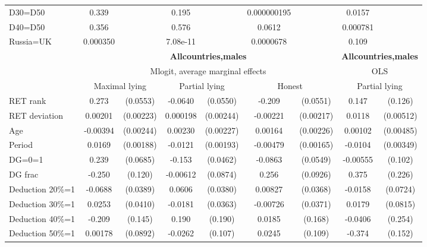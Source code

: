 \begin{tabular}{l|cccccc|cc}
D30=D50         &    0.339         &         &    0.195         &         &0.000000195         &         &   0.0157         &         \\
D40=D50         &    0.356         &         &    0.576         &         &   0.0612         &         & 0.000781         &         \\
Russia=UK       & 0.000350         &         & 7.08e-11         &         &0.0000678         &         &    0.109         &         \\
\hline\hline
&\multicolumn{6}{c|}{\bf All\space{}countries,\space{}males}&\multicolumn{2}{c}{\bf All\space{}countries,\space{}males}\\ &\multicolumn{6}{c|}{Mlogit, average marginal effects }&\multicolumn{2}{c}{OLS}\\
                &\multicolumn{2}{c}{Maximal lying}&\multicolumn{2}{c}{Partial lying}&\multicolumn{2}{c}{Honest}  &\multicolumn{2}{c}{Partial lying}\\
\hline
RET rank        &    0.273\sym{***}& (0.0553)&  -0.0640         & (0.0550)&   -0.209\sym{***}& (0.0551)&    0.147         &  (0.126)\\
RET deviation   &  0.00201         &(0.00223)& 0.000198         &(0.00244)& -0.00221         &(0.00217)&   0.0118\sym{**} &(0.00512)\\
Age             & -0.00394         &(0.00244)&  0.00230         &(0.00227)&  0.00164         &(0.00226)&  0.00102         &(0.00485)\\
Period          &   0.0169\sym{***}&(0.00188)&  -0.0121\sym{***}&(0.00193)& -0.00479\sym{***}&(0.00165)&  -0.0104\sym{***}&(0.00349)\\
DG=0=1          &    0.239\sym{***}& (0.0685)&   -0.153\sym{***}& (0.0462)&  -0.0863         & (0.0549)& -0.00555         &  (0.102)\\
DG frac         &   -0.250\sym{**} &  (0.120)& -0.00612         & (0.0874)&    0.256\sym{***}& (0.0926)&    0.375         &  (0.226)\\
Deduction 20\%=1&  -0.0688\sym{*}  & (0.0389)&   0.0606         & (0.0380)&  0.00827         & (0.0368)&  -0.0158         & (0.0724)\\
Deduction 30\%=1&   0.0253         & (0.0410)&  -0.0181         & (0.0363)& -0.00726         & (0.0371)&   0.0179         & (0.0815)\\
Deduction 40\%=1&   -0.209         &  (0.145)&    0.190         &  (0.190)&   0.0185         &  (0.168)&  -0.0406         &  (0.254)\\
Deduction 50\%=1&  0.00178         & (0.0892)&  -0.0262         &  (0.107)&   0.0245         &  (0.109)&   -0.374\sym{**} &  (0.152)\\

\end{tabular}
